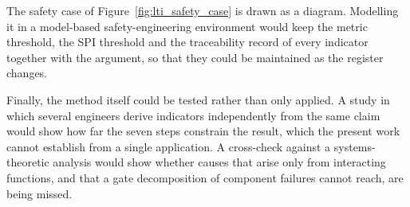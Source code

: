 The safety case of Figure~\ref{fig:lti_safety_case} is drawn as a diagram. Modelling
it in a model-based safety-engineering environment would keep the metric threshold,
the SPI threshold and the traceability record of every indicator together with the
argument, so that they could be maintained as the register changes.

Finally, the method itself could be tested rather than only applied. A study in
which several engineers derive indicators independently from the same claim would
show how far the seven steps constrain the result, which the present work cannot
establish from a single application. A cross-check against a systems-theoretic
analysis would show whether causes that arise only from interacting functions,
and that a gate decomposition of component failures cannot reach, are being
missed.
